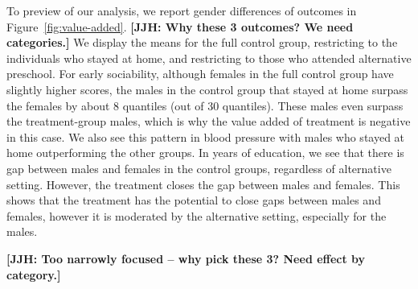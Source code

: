 To preview of our analysis, we report gender differences of outcomes in Figure~\ref{fig:value-added}. \textbf{[JJH: Why these 3 outcomes? We need categories.]} We display the means for the full control group, restricting to the individuals who stayed at home, and restricting to those who attended alternative preschool. For early sociability, although females in the full control group have slightly higher scores, the males in the control group that stayed at home surpass the females by about 8 quantiles (out of 30 quantiles). These males even surpass the treatment-group males, which is why the value added of treatment is negative in this case. We also see this pattern in blood pressure with males who stayed at home outperforming the other groups. In years of education, we see that there is gap between males and females in the control groups, regardless of alternative setting. However, the treatment closes the gap between males and females. This shows that the treatment has the potential to close gaps between males and females, however it is moderated by the alternative setting, especially for the males.

\textbf{[JJH: Too narrowly focused -- why pick these 3? Need effect by category.]}

